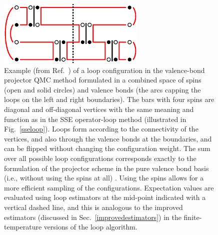 \documentclass[draft,numberedheadings]{aipproc}
\begin{document}
\begin{figure}
\includegraphics[width=7cm, clip]{vbloops.eps}
\caption{Example (from Ref.~\cite{awshg}) of a loop configuration in the valence-bond projector QMC method formulated in a combined 
space of spins (open and solid circles) and valence bonds (the arcs capping the loops on the left and right boundaries). The bars with
four spins are diagonal and off-diagonal vertices with the same meaning and function as in the SSE operator-loop method (illustrated 
in Fig.~\ref{sseloop}). Loops form according to the connectivity of the vertices, and also through the valence bonds at the boundaries,
and can be flipped without changing the configuration weight. The sum over all possible loop configurations corresponds exactly to the 
formulation of the projector scheme in the pure valence bond basis (i.e., without using the spins at all) \cite{vbmethod1}. Using the 
spins allows for a more efficient sampling of the configurations. Expectation values are evaluated using loop estimators at the mid-point 
indicated with a vertical dashed line, and this is analogous to the improved estimators (discussed in Sec.~\ref{improvedestimators}) 
in the finite-temperature versions of the loop algorithm.}
\label{vbloops}
\end{figure}
\end{document}
